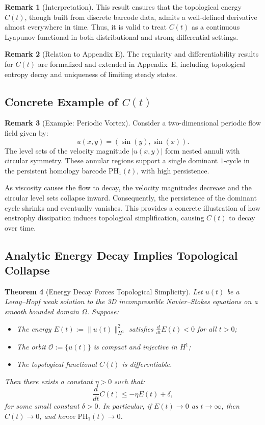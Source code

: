 \documentclass[11pt]{article}
\newtheorem{theorem}{Theorem}[section]
\theoremstyle{definition}
\newtheorem{remark}[theorem]{Remark}
\begin{document}
\begin{remark}[Interpretation]
This result ensures that the topological energy $C(t)$, though built from discrete barcode data, admits a well-defined derivative almost everywhere in time. Thus, it is valid to treat $C(t)$ as a continuous Lyapunov functional in both distributional and strong differential settings.
\end{remark}

\begin{remark}[Relation to Appendix E]
The regularity and differentiability results for $C(t)$ are formalized and extended in Appendix~E, including topological entropy decay and uniqueness of limiting steady states.
\end{remark}

\subsection{Concrete Example of $C(t)$}

\begin{remark}[Example: Periodic Vortex]
Consider a two-dimensional periodic flow field given by:
\[
    u(x, y) = (\sin(y), \sin(x)).
\]
The level sets of the velocity magnitude $|u(x, y)|$ form nested annuli with circular symmetry. These annular regions support a single dominant $1$-cycle in the persistent homology barcode $\mathrm{PH}_1(t)$, with high persistence.

As viscosity causes the flow to decay, the velocity magnitudes decrease and the circular level sets collapse inward. Consequently, the persistence of the dominant cycle shrinks and eventually vanishes. This provides a concrete illustration of how enstrophy dissipation induces topological simplification, causing $C(t)$ to decay over time.
\end{remark}

\subsection{Analytic Energy Decay Implies Topological Collapse}

\begin{theorem}[Energy Decay Forces Topological Simplicity]
Let $u(t)$ be a Leray--Hopf weak solution to the 3D incompressible Navier--Stokes equations on a smooth bounded domain $\Omega$. Suppose:
\begin{itemize}
    \item The energy $E(t) := \|u(t)\|_{H^1}^2$ satisfies $\frac{d}{dt} E(t) < 0$ for all $t > 0$;
    \item The orbit $\mathcal{O} := \{ u(t) \}$ is compact and injective in $H^1$;
    \item The topological functional $C(t)$ is differentiable.
\end{itemize}
Then there exists a constant $\eta > 0$ such that:
\[
\frac{d}{dt} C(t) \leq -\eta E(t) + \delta,
\]
for some small constant $\delta > 0$. In particular, if $E(t) \to 0$ as $t \to \infty$, then $C(t) \to 0$, and hence $\mathrm{PH}_1(t) \to 0$.
\end{theorem}
\end{document}
